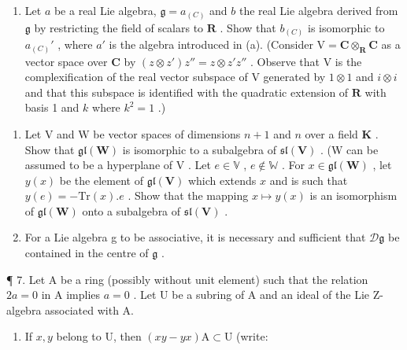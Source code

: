\begin{enumerate}
\def\labelenumi{(\alph{enumi})}
\setcounter{enumi}{1}
\tightlist
\item
  Let \(a\) be a real Lie algebra, \(\mathfrak{g} = a_{(C)}\) and \(b\) the real Lie algebra derived from \(\mathfrak{g}\) by restricting the field of scalars to \(\mathbf{R}\) . Show that \(b_{(C)}\) is isomorphic to \(a_{(C)}'\) , where \(a'\) is the algebra introduced in (a). (Consider \(\mathrm{V} = \mathbf{C} \otimes_{\mathbf{R}} \mathbf{C}\) as a vector space over \(\mathbf{C}\) by \((z \otimes z')z'' = z \otimes z'z''\) . Observe that \(\mathrm{V}\) is the complexification of the real vector subspace of \(\mathrm{V}\) generated by \(1 \otimes 1\) and \(i \otimes i\) and that this subspace is identified with the quadratic extension of \(\mathbf{R}\) with basis 1 and \(k\) where \(k^2 = 1\) .)
\end{enumerate}

\begin{enumerate}
\def\labelenumi{\arabic{enumi}.}
\setcounter{enumi}{4}
\item
  Let \(\mathrm{V}\) and \(\mathrm{W}\) be vector spaces of dimensions \(n + 1\) and \(n\) over a field \(\mathbf{K}\) . Show that \(\mathfrak{gl}(\mathbf{W})\) is isomorphic to a subalgebra of \(\mathfrak{sl}(\mathbf{V})\) . (W can be assumed to be a hyperplane of \(\mathrm{V}\) . Let \(e \in \mathbb{V}\) , \(e \notin \mathbb{W}\) . For \(x \in \mathfrak{gl}(\mathbf{W})\) , let \(y(x)\) be the element of \(\mathfrak{gl}(\mathbf{V})\) which extends \(x\) and is such that \(y(e) = -\mathrm{Tr}(x).e\) . Show that the mapping \(x \mapsto y(x)\) is an isomorphism of \(\mathfrak{gl}(\mathbf{W})\) onto a subalgebra of \(\mathfrak{sl}(\mathbf{V})\) .
\item
  For a Lie algebra g to be associative, it is necessary and sufficient that \(\mathcal{D}\mathfrak{g}\) be contained in the centre of \(\mathfrak{g}\) .
\end{enumerate}

¶ 7. Let A be a ring (possibly without unit element) such that the relation \(2a = 0\) in A implies \(a = 0\) . Let U be a subring of A and an ideal of the Lie Z-algebra associated with A.

\begin{enumerate}
\def\labelenumi{(\alph{enumi})}
\tightlist
\item
  If \(x, y\) belong to U, then \((xy - yx)\mathrm{A} \subset \mathrm{U}\) (write:
\end{enumerate}

